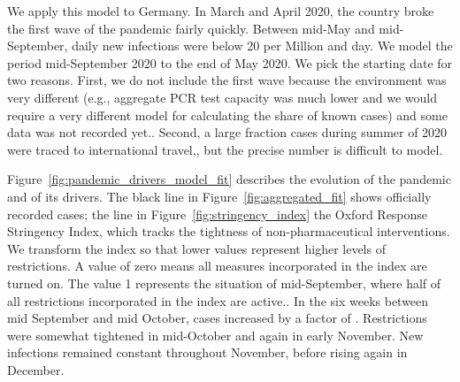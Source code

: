 We apply this model to Germany. In March and April 2020, the country broke the first wave of the pandemic fairly quickly. Between mid-May and mid-September, daily new infections were below 20 per Million and day. We model the period mid-September 2020 to the end of May 2020. We pick the starting date for two reasons. First, we do not include the first wave because the environment was very different (e.g., aggregate PCR test capacity was much lower and we would require a very different model for calculating the share of known cases) and some data was not recorded yet.. Second, a large fraction cases during summer of 2020 were traced to international travel,, but the precise number is difficult to model.

Figure~\ref{fig:pandemic_drivers_model_fit} describes the evolution of the pandemic and of its drivers. The black line in Figure~\ref{fig:aggregated_fit} shows officially recorded cases; the  line in Figure~\ref{fig:stringency_index} the Oxford Response Stringency Index\cite{Hale2020}, which tracks the tightness of non-pharmaceutical interventions. We transform the index so that lower values represent higher levels of restrictions. A value of zero means all measures incorporated in the index are turned on. The value 1 represents the situation of mid-September, where half of all restrictions incorporated in the index are active.. In the six weeks between mid September and mid October, cases increased by a factor of . Restrictions were somewhat tightened in mid-October and again in early November. New infections remained constant throughout November, before rising again in December.


